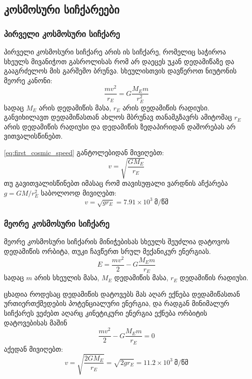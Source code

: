 \documentclass{book}
\begin{document}
\subsection{კოსმოსური სიჩქარეები}
\subsubsection{პირველი კოსმოსური სიჩქარე}
პირველი კოსმოსური სიჩქარე არის ის სიჩქარე, რომელიც საჭიროა სხეულს მივანიჭოთ გასროლისას რომ არ დაეცეს უკან დედამიწაზე და გააგრძელოს მის გარშემო ბრუნვა. სხეულისთვის დავწეროთ ნიუტონის მეორე კანონი:
		\begin{equation}
			\frac{mv^2}{r_E} = G\frac{M_Em}{r_E^2}
			\label{eq:first_cosmic_speed}
		\end{equation}
სადაც $M_E$ არის დედამიწის მასა, $r_E$ არის დედამიწის რადიუსი. განვიხილავთ დედამიწასთან ახლოს მბრუნავ თანამგზავრს ამიტომაც $r_E$ არის დედამიწის რადიუსი და დედამიწის ზედაპირიდან დაშორებას არ ვითვალისწინებთ.

\ref{eq:first_cosmic_speed} განტოლებიდან მივიღებთ:
	\begin{equation}
		v = \sqrt{\frac{G M_E}{r_E}}
	\end{equation}
თუ გავითვალისწინებთ იმასაც რომ თავისუფალი ვარდნის აჩქარება $g = GM/r_E^2$ საბოლოოდ მივიღებთ:
	\begin{equation}
		v = \sqrt{g r_E} = 7.91 \times 10^3 ~ \text{მ/წმ}
	\end{equation}
	
\subsubsection{მეორე კოსმოსური სიჩქარე}
მეორე კოსმოსური სიჩქარის მინიჭებისას სხეულს შეუძლია დატოვოს დედამიწის ორბიტა, თუკი ჩავწერთ სრულ მექანიკურ ენერგიას. 
			\begin{equation}
				E = \frac{mv^2}{2} - G\frac{M_E m}{r_E}
			\end{equation}
სადაც $m$ არის სხეულის მასა, $M_E$ დედამიწის მასა, $r_E$ დედამიწის რადიუსი. 

ცხადია როდესაც დედამიწის დატოვებს მას აღარ ექნება დედამიწასთან ურთიერთქმედების პოტენციალური ენერგია, და რადგან მინიმალურ სიჩქარეს ვეძებთ აღარც კინეტიკური ენერგია ექნება ორბიტის დატოვებისას მაშინ
			\begin{equation}
				\frac{mv^2}{2} - G\frac{M_E m}{r_E} = 0
			\end{equation}
აქედან მივიღებთ:
			\begin{equation}
				v = \sqrt{\frac{2GM_E}{r_E}} = \sqrt{2 g r_E} = 11.2 \times 10^3 ~ \text{მ/წმ}
			\end{equation}
\end{document}
